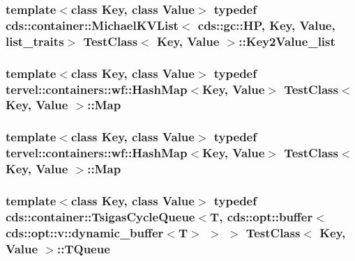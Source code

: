 \subsubsection[{Key2\+Value\+\_\+list}]{\setlength{\rightskip}{0pt plus 5cm}template$<$class Key, class Value$>$ typedef cds\+::container\+::\+Michael\+K\+V\+List$<$ cds\+::gc\+::\+H\+P, Key, {\bf Value}, {\bf list\+\_\+traits}$>$ {\bf Test\+Class}$<$ Key, {\bf Value} $>$\+::{\bf Key2\+Value\+\_\+list}\hspace{0.3cm}{\ttfamily [private]}}\label{class_test_class_a5c18ae754153ec12a6591663ca817565}
\hypertarget{class_test_class_a1b85c62e95a514dec1b9680e76348329}{}
\subsubsection[{Map}]{\setlength{\rightskip}{0pt plus 5cm}template$<$class Key, class Value$>$ typedef {\bf tervel\+::containers\+::wf\+::\+Hash\+Map}$<$Key, {\bf Value}$>$ {\bf Test\+Class}$<$ Key, {\bf Value} $>$\+::{\bf Map}}\label{class_test_class_a1b85c62e95a514dec1b9680e76348329}
\hypertarget{class_test_class_a1b85c62e95a514dec1b9680e76348329}{}
\subsubsection[{Map}]{\setlength{\rightskip}{0pt plus 5cm}template$<$class Key, class Value$>$ typedef {\bf tervel\+::containers\+::wf\+::\+Hash\+Map}$<$Key, {\bf Value}$>$ {\bf Test\+Class}$<$ Key, {\bf Value} $>$\+::{\bf Map}}\label{class_test_class_a1b85c62e95a514dec1b9680e76348329}
\hypertarget{class_test_class_ae96e169a6dee97fddd6acfc655497f0c}{}
\subsubsection[{T\+Queue}]{\setlength{\rightskip}{0pt plus 5cm}template$<$class Key, class Value$>$ typedef cds\+::container\+::\+Tsigas\+Cycle\+Queue$<$T, cds\+::opt\+::buffer$<$ cds\+::opt\+::v\+::dynamic\+\_\+buffer$<$T$>$ $>$ $>$ {\bf Test\+Class}$<$ Key, {\bf Value} $>$\+::{\bf T\+Queue}\hspace{0.3cm}{\ttfamily [private]}}\label{class_test_class_ae96e169a6dee97fddd6acfc655497f0c}


